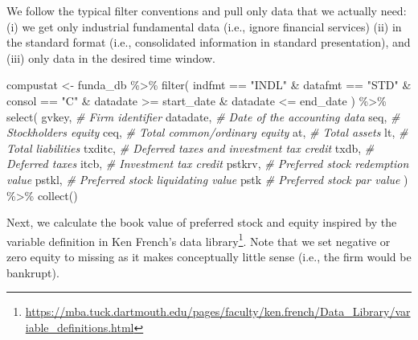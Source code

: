 \documentclass[
]{krantz}
\newenvironment{Shaded}{\begin{snugshade}}{\end{snugshade}}
\newcommand{\CommentTok}[1]{\textcolor[rgb]{0.37,0.37,0.37}{\textit{#1}}}
\newcommand{\FunctionTok}[1]{\textcolor[rgb]{0,0,0}{#1}}
\newcommand{\NormalTok}[1]{#1}
\newcommand{\OtherTok}[1]{\textcolor[rgb]{0.37,0.37,0.37}{#1}}
\newcommand{\SpecialCharTok}[1]{\textcolor[rgb]{0,0,0}{#1}}
\newcommand{\StringTok}[1]{\textcolor[rgb]{0.5,0.5,0.5}{#1}}
\renewcommand{\href}[2]{#2\footnote{\url{#1}}}
\begin{document}
We follow the typical filter conventions and pull only data that we actually need: (i) we get only industrial fundamental data (i.e., ignore financial services) (ii) in the standard format (i.e., consolidated information in standard presentation), and (iii) only data in the desired time window.

\begin{Shaded}
\begin{Highlighting}[]
\NormalTok{compustat }\OtherTok{\textless{}{-}}\NormalTok{ funda\_db }\SpecialCharTok{\%\textgreater{}\%}
  \FunctionTok{filter}\NormalTok{(}
\NormalTok{    indfmt }\SpecialCharTok{==} \StringTok{"INDL"} \SpecialCharTok{\&}
\NormalTok{      datafmt }\SpecialCharTok{==} \StringTok{"STD"} \SpecialCharTok{\&}
\NormalTok{      consol }\SpecialCharTok{==} \StringTok{"C"} \SpecialCharTok{\&}
\NormalTok{      datadate }\SpecialCharTok{\textgreater{}=}\NormalTok{ start\_date }\SpecialCharTok{\&}\NormalTok{ datadate }\SpecialCharTok{\textless{}=}\NormalTok{ end\_date}
\NormalTok{  ) }\SpecialCharTok{\%\textgreater{}\%}
  \FunctionTok{select}\NormalTok{(}
\NormalTok{    gvkey, }\CommentTok{\# Firm identifier}
\NormalTok{    datadate, }\CommentTok{\# Date of the accounting data}
\NormalTok{    seq, }\CommentTok{\# Stockholders\textquotesingle{} equity}
\NormalTok{    ceq, }\CommentTok{\# Total common/ordinary equity}
\NormalTok{    at, }\CommentTok{\# Total assets}
\NormalTok{    lt, }\CommentTok{\# Total liabilities}
\NormalTok{    txditc, }\CommentTok{\# Deferred taxes and investment tax credit}
\NormalTok{    txdb, }\CommentTok{\# Deferred taxes}
\NormalTok{    itcb, }\CommentTok{\# Investment tax credit}
\NormalTok{    pstkrv, }\CommentTok{\# Preferred stock redemption value}
\NormalTok{    pstkl, }\CommentTok{\# Preferred stock liquidating value}
\NormalTok{    pstk }\CommentTok{\# Preferred stock par value}
\NormalTok{  ) }\SpecialCharTok{\%\textgreater{}\%}
  \FunctionTok{collect}\NormalTok{()}
\end{Highlighting}
\end{Shaded}

Next, we calculate the book value of preferred stock and equity inspired by the \href{https://mba.tuck.dartmouth.edu/pages/faculty/ken.french/Data_Library/variable_definitions.html}{variable definition in Ken French's data library}. Note that we set negative or zero equity to missing as it makes conceptually little sense (i.e., the firm would be bankrupt).
\end{document}
